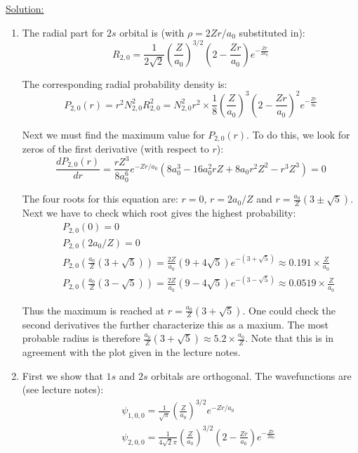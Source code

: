 \noindent
\underline{Solution:}\\

\begin{enumerate}
\item The radial part for $2s$ orbital is (with $\rho = 2Zr/a_0$ substituted in):
$$R_{2,0} = \frac{1}{2\sqrt{2}}\left(\frac{Z}{a_0}\right)^{3/2}\left(2 - \frac{Zr}{a_0}\right)e^{-\frac{Zr}{2a_0}}$$

The corresponding radial probability density is:
$$P_{2,0}(r) = r^2N^2_{2,0}R^2_{2,0} = N^2_{2,0}r^2\times\frac{1}{8}\left(\frac{Z}{a_0}\right)^3\left(2 - \frac{Zr}{a_0}\right)^2e^{-\frac{Zr}{a_0}}$$

Next we must find the maximum value for $P_{2,0}(r)$. To do this, we look for zeros of the first derivative (with respect to $r$):
$$\frac{dP_{2,0}(r)}{dr} = \frac{rZ^3}{8a_0^6}e^{-Zr/a_0}\left(8a_0^3 - 16a_0^2rZ + 8a_0r^2Z^2 - r^3Z^3\right) = 0$$

The four roots for this equation are: $r = 0$, $r = 2a_0/Z$ and $r = \frac{a_0}{Z}\left(3 \pm \sqrt{5}\right)$. Next we have to check which root gives the highest probability:
\begin{eqnarray}
\nonumber
& & P_{2,0}(0) = 0\\
\nonumber
& & P_{2,0}(2a_0/Z) = 0\\
\nonumber
& & P_{2,0}\left(\frac{a_0}{Z}\left(3 + \sqrt{5}\right)\right) = \frac{2Z}{a_0}\left(9 + 4\sqrt{5}\right)e^{-(3 + \sqrt{5})}\approx 0.191\times \frac{Z}{a_0}\\
\nonumber
& & P_{2,0}\left(\frac{a_0}{Z}\left(3 - \sqrt{5}\right)\right) = \frac{2Z}{a_0}\left(9 - 4\sqrt{5}\right)e^{-(3 - \sqrt{5})}\approx 0.0519\times \frac{Z}{a_0}
\end{eqnarray}

Thus the maximum is reached at $r = \frac{a_0}{Z}\left(3 + \sqrt{5}\right)$. One could check the second derivatives the further characterize this as a maxium. The most probable radius is therefore $\frac{a_0}{Z}\left(3 + \sqrt{5}\right)\approx 5.2\times\frac{a_0}{Z}$. Note that this is in agreement with the plot given in the lecture notes.

\item First we show that $1s$ and $2s$ orbitals are orthogonal. The wavefunctions are (see lecture notes):
\begin{eqnarray}
\nonumber
& & \psi_{1,0,0} = \frac{1}{\sqrt{\pi}}\left(\frac{Z}{a_0}\right)^{3/2}e^{-Zr/a_0}\\
\nonumber
& & \psi_{2,0,0} = \frac{1}{4\sqrt{2}\pi}\left(\frac{Z}{a_0}\right)^{3/2}\left(2 - \frac{Zr}{a_0}\right)e^{-\frac{Zr}{2a_0}}
\end{eqnarray}


\end{enumerate}
